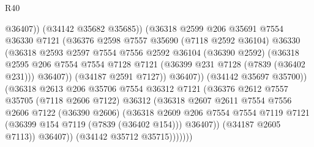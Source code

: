 \begin{lexlean}{R40}
\begin{coremodule}
                                @36407))
                            (@34142 @35682 @35685))
                          (@36318
                            @2599
                            @206
                            @35691
                            @7554
                            @36330
                            @7121
                            (@36376
                              @2598
                              @7557
                              @35690
                              (@7118 @2592 @36104)
                              @36330
                              (@36318
                                @2593
                                @2597
                                @7554
                                @7556
                                @2592
                                @36104
                                (@36390 @2592)
                                (@36318
                                  @2595
                                  @206
                                  @7554
                                  @7554
                                  @7128
                                  @7121
                                  (@36399 @231 @7128 (@7839 (@36402 @231)))
                                  @36407))
                              (@34187 @2591 @7127))
                            @36407))
                        (@34142 @35697 @35700))
                      (@36318
                        @2613
                        @206
                        @35706
                        @7554
                        @36312
                        @7121
                        (@36376
                          @2612
                          @7557
                          @35705
                          (@7118 @2606 @7122)
                          @36312
                          (@36318
                            @2607
                            @2611
                            @7554
                            @7556
                            @2606
                            @7122
                            (@36390 @2606)
                            (@36318
                              @2609
                              @206
                              @7554
                              @7554
                              @7119
                              @7121
                              (@36399 @154 @7119 (@7839 (@36402 @154)))
                              @36407))
                          (@34187 @2605 @7113))
                        @36407))
                    (@34142 @35712 @35715)))))))

\end{coremodule}
\end{lexlean}
